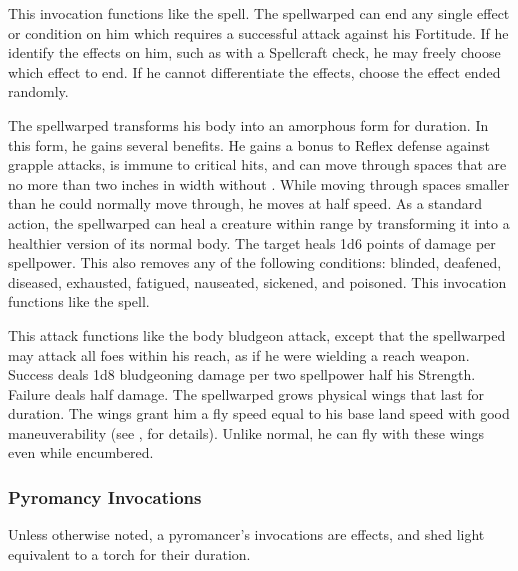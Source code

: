             This invocation functions like the  spell.
            The spellwarped can end any single effect or condition on him which requires a successful attack against his Fortitude.
            If he identify the effects on him, such as with a Spellcraft check, he may freely choose which effect to end.
            If he cannot differentiate the effects, choose the effect ended randomly.

            The spellwarped transforms his body into an amorphous form for \durshort duration.
            In this form, he gains several benefits.
            He gains a  bonus to Reflex defense against grapple attacks, is immune to critical hits, and can move through spaces that are no more than two inches in width without .
            While moving through spaces smaller than he could normally move through, he moves at half speed.
            As a standard action, the spellwarped can heal a creature within \rngclose range by transforming it into a healthier version of its normal body.
            The target heals 1d6 points of damage per spellpower.
            This also removes any of the following conditions: blinded, deafened, diseased, exhausted, fatigued, nauseated, sickened, and poisoned.
            This invocation functions like the  spell.

            This attack functions like the body bludgeon attack, except that the spellwarped may attack all foes within his reach, as if he were wielding a reach weapon.
            Success deals 1d8 bludgeoning damage per two spellpower \add half his Strength.
            Failure deals half damage.
            The spellwarped grows physical wings that last for \durshort duration.
            The wings grant him a fly speed equal to his base land speed with good maneuverability (see , for details).
            Unlike normal, he can fly with these wings even while encumbered.

        \subsubsection{Pyromancy Invocations}
            Unless otherwise noted, a pyromancer's invocations are  effects, and shed light equivalent to a torch for their duration.

